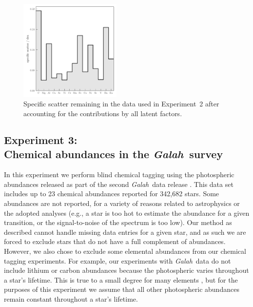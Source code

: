 \documentclass[twocolumn]{aastex62}
\newcommand{\project}[1]{\textsl{#1}}
\newcommand{\Galah}{\project{Galah}}
\begin{document}



\begin{figure}
	\includegraphics[width=0.45\textwidth]{experiments/exp2-log-xfe-offset-specific-scatter.pdf}
	\caption{Specific scatter remaining in the \citet{Barklem:2005} data used in
			 Experiment~2 after accounting for the contributions by all latent
			 factors.}
    \label{fig:exp2-specific-scatter}
\end{figure}



\subsection{Experiment 3:\\Chemical abundances in the \Galah\ survey}
\label{sec:exp4}

In this experiment we perform blind chemical tagging using the 
photospheric abundances released as part of the second \Galah\ 
data release \citep{Buder:2018}. This data set includes
up to 23 chemical abundances reported for 342,682 stars.
Some abundances are not reported, for a variety of 
reasons related to astrophysics or the adopted analyses
(e.g., a star is too hot to estimate the abundance for a given
transition, or the signal-to-noise of the spectrum is too low).
Our method as described cannot handle missing data entries for
a given star, and as such we are forced to exclude stars that
do not have a full complement of abundances. However, we also
chose to exclude some elemental abundances from our chemical
tagging experiments. For example, our experiments
with \Galah\ data do not include lithium or carbon abundances because the
photospheric varies throughout a star's lifetime. This is true
to a small degree for many elements \citep[e.g.,][]{Dotter:2017},
but for the purposes of this experiment we assume that all other
photospheric abundances remain constant throughout  a star's
lifetime.
\end{document}
